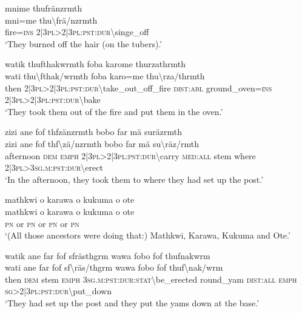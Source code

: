 \ea\label{ex:1:a3804}
mnime thufränzrmth\\
\gll mni=me	thu{\textbackslash}frä/nzrmth\\
     fire=\textsc{ins}	2|3\textsc{pl}>2|3\textsc{pl}:\textsc{pst}:\textsc{dur}{\textbackslash}singe\_off\\
\glt `They burned off the hair (on the tubers).'
\z

\ea\label{ex:1:a3805}
watik thufthakwrmth foba karome thurzathrmth\\
\gll wati	thu{\textbackslash}fthak/wrmth	foba	karo=me	thu{\textbackslash}rza/thrmth\\
     then	2|3\textsc{pl}>2|3\textsc{pl}:\textsc{pst}:\textsc{dur}{\textbackslash}take\_out\_off\_fire	\textsc{dist}:\textsc{abl}	ground\_oven=\textsc{ins}	2|3\textsc{pl}>2|3\textsc{pl}:\textsc{pst}:\textsc{dur}{\textbackslash}bake\\
\glt `They took them out of the fire and put them in the oven.'
\z

\newpage
\ea\label{ex:1:a3807}
zizi ane fof thfzänzrmth bobo far mä suräzrmth\\
\gll zizi	ane	fof	thf{\textbackslash}zä/nzrmth	bobo	far	mä	su{\textbackslash}räz/rmth\\
     afternoon	\textsc{dem}	\textsc{emph}	2|3\textsc{pl}>2|3\textsc{pl}:\textsc{pst}:\textsc{dur}{\textbackslash}carry	\textsc{med}:\textsc{all}	stem	where	2|3\textsc{pl}>3\textsc{sg}.\textsc{m}:\textsc{pst}:\textsc{dur}{\textbackslash}erect\\
\glt `In the afternoon, they took them to where they had set up the post.'
\z

\ea\label{ex:1:a3809}
mathkwi o karawa o kukuma o ote\\
\gll mathkwi	o	karawa	o	kukuma	o	ote\\
     \textsc{pn}	or	\textsc{pn}	or	\textsc{pn}	or	\textsc{pn}\\
\glt `(All those ancestors were doing that:) Mathkwi, Karawa, Kukuma and Ote.'
\z

\ea\label{ex:1:a3814}
watik ane far fof sfrästhgrm wawa fobo fof thufnakwrm\\
\gll wati	ane	far	fof	sf{\textbackslash}räs/thgrm	wawa	fobo	fof	thuf{\textbackslash}nak/wrm\\
     then	\textsc{dem}	stem	\textsc{emph}	3\textsc{sg}.\textsc{m}:\textsc{pst}:\textsc{dur}:\textsc{stat}{\textbackslash}be\_erected	round\_yam	\textsc{dist}:\textsc{all}	\textsc{emph}	\textsc{sg}>2|3\textsc{pl}:\textsc{pst}:\textsc{dur}{\textbackslash}put\_down\\
\glt `They had set up the post and they put the yams down at the base.'
\z

